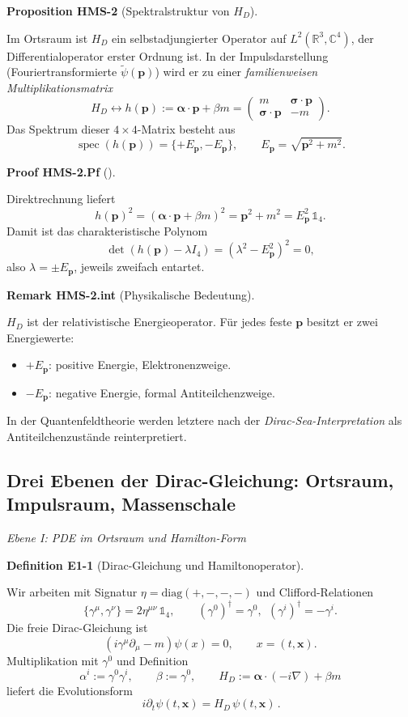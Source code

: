 \documentclass[10pt, letterpaper]{article}
\newcommand{\R}{\mathbb{R}}
\newcommand{\C}{\mathbb{C}}
\newcommand{\CustomHeading}[3]{%
  \par\medskip\noindent%
  \textbf{#1 #2} \textnormal{(#3)}.\enskip%
}
\newenvironment{DEF}[2]{\begin{unitbox}\CustomHeading{Definition}{#1}{#2}}{\end{unitbox}}
\newenvironment{PROP}[2]{\begin{unitbox}\CustomHeading{Proposition}{#1}{#2}}{\end{unitbox}}
\newenvironment{REM}[2]{\begin{unitbox}\CustomHeading{Remark}{#1}{#2}}{\end{unitbox}}
\newenvironment{PROOF}[2]{\begin{unitbox}\CustomHeading{Proof}{#1}{#2}}{\end{unitbox}}
\begin{document}
\begin{PROP}{HMS-2}{Spektralstruktur von $H_D$}
Im Ortsraum ist $H_D$ ein selbstadjungierter Operator auf $L^2(\R^3,\C^4)$, der Differentialoperator erster Ordnung ist.  
In der Impulsdarstellung (Fouriertransformierte $\tilde\psi(\mathbf p)$) wird er zu einer \emph{familienweisen Multiplikationsmatrix}
\[
 H_D \longleftrightarrow h(\mathbf p)
 := \boldsymbol{\alpha}\!\cdot\!\mathbf p + \beta m
 = \begin{pmatrix} m & \boldsymbol{\sigma}\!\cdot\!\mathbf p\\
                   \boldsymbol{\sigma}\!\cdot\!\mathbf p & -m \end{pmatrix}.
\]
Das Spektrum dieser $4\times4$-Matrix besteht aus
\[
 \operatorname{spec}(h(\mathbf p))=\{+E_{\mathbf p}, -E_{\mathbf p}\},\qquad E_{\mathbf p}=\sqrt{\mathbf p^2+m^2}.
\]
\end{PROP}

\begin{PROOF}{HMS-2.Pf}{}
Direktrechnung liefert
\[
 h(\mathbf p)^2 = (\boldsymbol{\alpha}\!\cdot\!\mathbf p + \beta m)^2
 = \mathbf p^2 + m^2 = E_{\mathbf p}^2\,\mathbb{1}_4.
\]
Damit ist das charakteristische Polynom
\[
 \det(h(\mathbf p)-\lambda I_4)=(\lambda^2 - E_{\mathbf p}^2)^2=0,
\]
also $\lambda=\pm E_{\mathbf p}$, jeweils zweifach entartet.
\end{PROOF}

\begin{REM}{HMS-2.int}{Physikalische Bedeutung}
$H_D$ ist der relativistische Energieoperator. Für jedes feste $\mathbf p$ besitzt er zwei Energiewerte:
\begin{itemize}
\item $+E_{\mathbf p}$: positive Energie, Elektronenzweige.
\item $-E_{\mathbf p}$: negative Energie, formal Antiteilchenzweige.
\end{itemize}
In der Quantenfeldtheorie werden letztere nach der \emph{Dirac-Sea-Interpretation} als Antiteilchenzustände reinterpretiert.
\end{REM}



\subsection{Drei Ebenen der Dirac-Gleichung: Ortsraum, Impulsraum, Massenschale}

\emph{Ebene I: PDE im Ortsraum und Hamilton-Form}

\begin{DEF}{E1-1}{Dirac-Gleichung und Hamiltonoperator}
Wir arbeiten mit Signatur $\eta=\mathrm{diag}(+,-,-,-)$ und Clifford-Relationen
\[
\{\gamma^\mu,\gamma^\nu\}=2\eta^{\mu\nu}\,\mathbb{1}_4,\qquad
(\gamma^0)^\dagger=\gamma^0,\ \ (\gamma^i)^\dagger=-\gamma^i.
\]
Die freie Dirac-Gleichung ist
\[
(i\gamma^\mu\partial_\mu-m)\psi(x)=0,\qquad x=(t,\mathbf x).
\]
Multiplikation mit $\gamma^0$ und Definition
\[
\alpha^i:=\gamma^0\gamma^i,\qquad \beta:=\gamma^0,\qquad
H_D:=\boldsymbol\alpha\!\cdot\!(-i\nabla)+\beta m
\]
liefert die Evolutionsform
\[
\boxed{\,i\partial_t\psi(t,\mathbf x)=H_D\,\psi(t,\mathbf x)\,}.
\]
\end{DEF}
\end{document}
